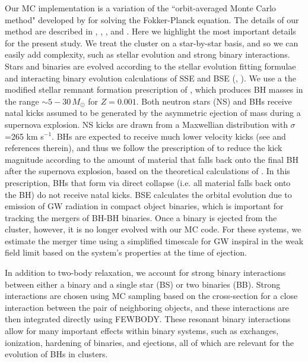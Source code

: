 \documentclass[12pt,preprint]{aastex}
\begin{document}
Our MC implementation is a variation of the ``orbit-averaged Monte Carlo 
method" developed by \cite{Henon1971a} for solving the Fokker-Planck 
equation. The details of our method are described in \cite{Joshi2000}, 
\cite{Joshi2001}, \cite{Fregeau2003}, \cite{Fregeau2007} and 
\cite{Chatterjee2010}. Here we highlight the most important details for
the present study. We treat the cluster on a star-by-star basis, and so we
can easily add complexity, such as stellar evolution and strong binary 
interactions. Stars and binaries are evolved according to the stellar
evolution fitting formulae and interacting binary evolution calculations
of SSE and BSE (\citealt{Hurley2000}, \citealt{Hurley2002}). We use a 
the modified stellar remnant formation prescription of \cite{Belczynski2002}, 
which produces BH masses in the range $\sim 5-30\, M_\odot$ for $Z=0.001$. 
Both neutron stars (NS) and BHs receive natal kicks
assumed to be generated by the asymmetric ejection of mass during 
a supernova explosion. NS kicks are drawn from a Maxwellian
distribution with $\sigma$=265 km s$^{-1}$. BHs are expected to receive
much lower velocity kicks (see \citealt{Wong2012} and references therein),
and thus we follow the prescription of \cite{Belczynski2002} to reduce the
kick magnitude according to the amount of material that falls back onto the 
final BH after the supernova explosion, based on the theoretical calculations of 
\cite{Fryer2001}.  In this prescription, BHs that form via direct collapse 
 (i.e. all material falls back onto the BH) do not receive natal kicks.
BSE calculates the orbital evolution due to emission of GW radiation in compact
 object binaries, which is important for tracking the mergers of 
BH-BH binaries. Once a binary is ejected from the cluster, however, 
it is no longer evolved with our MC code.
For these systems, we estimate the merger time using a simplified timescale 
for GW inspiral in the weak field limit \citep{Peters1964} based on the system's
properties at the time of ejection.

In addition to two-body relaxation, we account for
strong binary interactions between either a binary and a single star (BS)
or two binaries (BB). Strong interactions are chosen using MC sampling
based on the cross-section for a close interaction between the pair of 
neighboring objects, and these interactions are then integrated 
directly using FEWBODY. These resonant binary interactions allow for many
important effects within binary systems, such as exchanges, ionization, hardening
of binaries, and ejections, all of which are relevant for the evolution of BHs in clusters.
\end{document}
